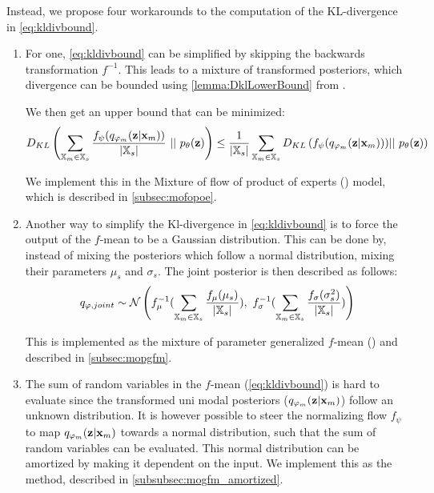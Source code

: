 Instead, we propose four workarounds to the computation of the KL-divergence in \cref{eq:kldivbound}.
\begin{enumerate}

    \item For one, \cref{eq:kldivbound} can be simplified by skipping the backwards transformation $f^{-1}$.
    This leads to a mixture of transformed posteriors, which divergence can be bounded using \cref{lemma:DklLowerBound} from \parencite{sutter_multimodal_2020}.

    We then get an upper bound that can be minimized:
    \begin{equation}
        D_{KL}\left(\sum _{\mathbb{X}_m \in \mathbb{X}_s} \frac{f_{\psi}(q_{\varphi_m}(\textbf{z}|\textbf{x}_m))}{|\mathbb{X}_s|}\ ||\ p_{\theta}(\textbf{z})\right) \leq \frac{1}{|\mathbb{X}_s|} \sum  _{\mathbb{X}_m \in \mathbb{X}_s} D_{KL} \left(f_{\psi} (q_{\varphi_m}(\textbf{z}|\textbf{x}_m)))||\ p_{\theta}(\textbf{z}) \right)
    \end{equation}

    We implement this in the Mixture of flow of product of experts () model, which is described in \cref{subsec:mofopoe}.


    \item Another way to simplify the Kl-divergence in \cref{eq:kldivbound} is to force the output of the $f$-mean to be a Gaussian distribution.
    This can be done by, instead of mixing the posteriors which follow a normal distribution, mixing their parameters $\mu_s$ and $\sigma_s$.
    The joint posterior is then described as follows:
    \begin{equation}
        \label{eq:qjointmopgfm}
        q_{\phi, joint} \sim \mathcal{N}\left(  f_{\mu}^{-1}(\sum _{\xsetm \in \xsubset} \frac{f_{\mu}(\mu_s)}{|\xsubset|}),\ f_{\sigma}^{-1}(\sum  _{\xsetm \in \xsubset} \frac{f_{\sigma}(\sigma_s^2)}{|\xsubset|})\right)
    \end{equation}

    This is implemented as the mixture of parameter generalized $f$-mean () and described in \cref{subsec:mopgfm}.

    \item The sum of random variables in the $f$-mean (\cref{eq:kldivbound}) is hard to evaluate since the transformed uni modal posteriors ($q_{\varphi_m}(\textbf{z}|\textbf{x}_m)$) follow an unknown distribution.
    It is however possible to steer the normalizing flow $f_{\psi}$ to map $q_{\varphi_m}(\textbf{z}|\textbf{x}_m)$ towards a normal distribution, such that the sum of random variables can be evaluated.
    This normal distribution can be amortized by making it dependent on the input.
    We implement this as the  method, described in \cref{subsubsec:mogfm_amortized}.


\end{enumerate}

